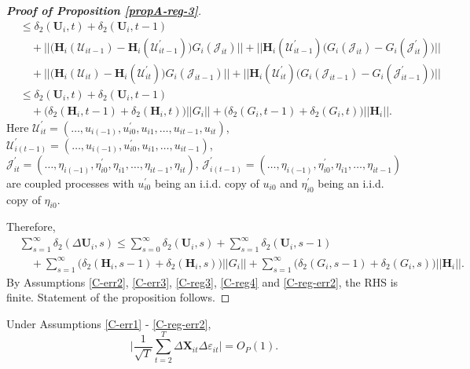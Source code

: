 \documentclass[a4paper,12pt]{article}
\begin{document}
\begin{proof}[\textnormal{\textbf{Proof of Proposition \ref{propA-reg-3}}}]
\begin{align*}
  &\leq \delta_2(\mathbf{U}_i, t) + \delta_2(\mathbf{U}_i, t-1)   \\
  &\quad +||\big(\mathbf{H}_i(\mathcal{U}_{it-1}) - \mathbf{H}_i(\mathcal{U}_{it-1}^\prime)\big) G_i(\mathcal{J}_{it})|| +  ||\mathbf{H}_i(\mathcal{U}_{it-1}^\prime)\big(G_i(\mathcal{J}_{it}) - G_i(\mathcal{J}_{it}^\prime)\big)    ||\\
 &\quad + ||\big(\mathbf{H}_i(\mathcal{U}_{it}) -\mathbf{H}_i(\mathcal{U}_{it}^\prime)\big)G_i(\mathcal{J}_{it-1})|| + ||\mathbf{H}_i(\mathcal{U}_{it}^\prime)\big(G_i(\mathcal{J}_{it-1}) -G_i(\mathcal{J}_{it-1}^\prime)\big) ||  \\
 &\leq \delta_2(\mathbf{U}_i, t) + \delta_2(\mathbf{U}_i, t-1)  \\
&\quad + \big(\delta_2(\mathbf{H}_i, t-1) +  \delta_2(\mathbf{H}_i, t)\big) ||G_i || + \big( \delta_2(G_i, t-1) +  \delta_2(G_i, t)\big)||\mathbf{H}_i ||.
\end{align*}
Here $\mathcal{U}_{it}^\prime  = (\ldots, u_{i(-1)}, u^\prime_{i0}, u_{i1}, \ldots, u_{it-1}, u_{it})$, $\mathcal{U}_{i(t-1)}^\prime  = (\ldots, u_{i(-1)}, u^\prime_{i0}, u_{i1}, \ldots, u_{it-1})$, $\mathcal{J}_{it}^\prime  = (\ldots, \eta_{i(-1)}, \eta^\prime_{i0}, \eta_{i1}, \ldots, \eta_{it-1}, \eta_{it})$, $\mathcal{J}_{i(t-1)}^\prime  = (\ldots, \eta_{i(-1)}, \eta^\prime_{i0}, \eta_{i1}, \ldots, \eta_{it-1})$ are coupled processes with $u_{i0}^\prime$ being an i.i.d. copy of $u_{i0}$ and $\eta_{i0}^\prime$ being an i.i.d. copy of $\eta_{i0}$.

\vspace{2mm}
Therefore,
\begin{align*}
 &\sum_{s=1}^\infty \delta_2(\Delta \mathbf{U}_i, s) \leq \sum_{s=0}^\infty \delta_2(\mathbf{U}_i, s) + \sum_{s=1}^\infty\delta_2(\mathbf{U}_i, s-1)  \\
 &\quad + \sum_{s=1}^\infty\big(\delta_2(\mathbf{H}_i, s-1) +  \delta_2(\mathbf{H}_i, s)\big) ||G_i || + \sum_{s=1}^\infty\big( \delta_2(G_i, s-1) +  \delta_2(G_i, s)\big)||\mathbf{H}_i ||.
\end{align*}
By Assumptions \ref{C-err2}, \ref{C-err3}, \ref{C-reg3}, \ref{C-reg4} and \ref{C-reg-err2}, the RHS is finite. Statement of the proposition follows. 
\end{proof}


\begin{propA}\label{propA:beta4}
Under Assumptions \ref{C-err1} - \ref{C-reg-err2},
\[ \Big| \frac{1}{\sqrt{T}}\sum_{t=2}^T \Delta \mathbf{X}_{it}\Delta \varepsilon_{it} \Big| = O_P(1).
\]
\end{propA}
\end{document}
